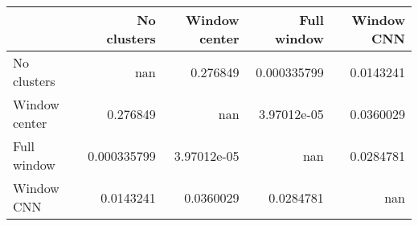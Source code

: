 \begin{tabular}{lrrrr}
\toprule
               &   No clusters &   Window center &   Full window &   Window CNN \\
\midrule
 No clusters   & nan           &     0.276849    &   0.000335799 &    0.0143241 \\
 Window center &   0.276849    &   nan           &   3.97012e-05 &    0.0360029 \\
 Full window   &   0.000335799 &     3.97012e-05 & nan           &    0.0284781 \\
 Window CNN    &   0.0143241   &     0.0360029   &   0.0284781   &  nan         \\
\bottomrule
\end{tabular}